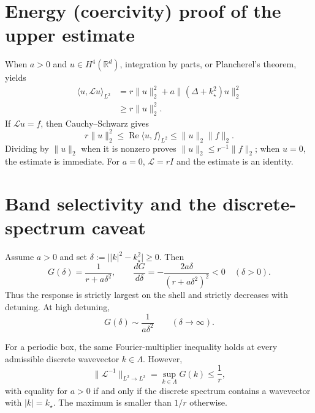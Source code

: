 \documentclass[11pt]{article}
\newcommand{\R}{\mathbb R}
\newcommand{\ip}[2]{\langle #1,#2\rangle}
\newcommand{\norm}[1]{\lVert #1\rVert}
\begin{document}
\section{Energy (coercivity) proof of the upper estimate}

When $a>0$ and $u\in H^4(\R^d)$, integration by parts, or
Plancherel's theorem, yields
\begin{equation}\label{eq:coercivity}
\begin{aligned}
  \ip{u}{\mathcal Lu}_{L^2}
  &=r\norm{u}_2^2
    +a\norm{(\Delta+k_\star^2)u}_2^2\\
  &\geq r\norm{u}_2^2.
\end{aligned}
\end{equation}
If $\mathcal Lu=f$, then Cauchy--Schwarz gives
\begin{equation}
  r\norm{u}_2^2
  \leq\operatorname{Re}\ip{u}{f}_{L^2}
  \leq\norm{u}_2\norm{f}_2.
\end{equation}
Dividing by $\norm{u}_2$ when it is nonzero proves
$\norm{u}_2\leq r^{-1}\norm{f}_2$; when $u=0$, the estimate is
immediate. For $a=0$, $\mathcal L=rI$ and the estimate is an
identity.

\section{Band selectivity and the discrete-spectrum caveat}

Assume $a>0$ and set
$\delta:=\bigl||k|^2-k_\star^2\bigr|\geq0$. Then
\begin{equation}
  G(\delta)=\frac{1}{r+a\delta^2},
  \qquad
  \frac{dG}{d\delta}
  =-\frac{2a\delta}{(r+a\delta^2)^2}<0
  \quad(\delta>0).
\end{equation}
Thus the response is strictly largest on the shell and strictly
decreases with detuning. At high detuning,
\begin{equation}
  G(\delta)\sim\frac{1}{a\delta^2}
  \qquad(\delta\to\infty).
\end{equation}

For a periodic box, the same Fourier-multiplier inequality holds
at every admissible discrete wavevector $k\in\Lambda$. However,
\begin{equation}
  \norm{\mathcal L^{-1}}_{L^2\to L^2}
  =\sup_{k\in\Lambda}G(k)
  \leq\frac1r,
\end{equation}
with equality for $a>0$ if and only if the discrete spectrum
contains a wavevector with $|k|=k_\star$. The maximum is smaller
than $1/r$ otherwise.
\end{document}
